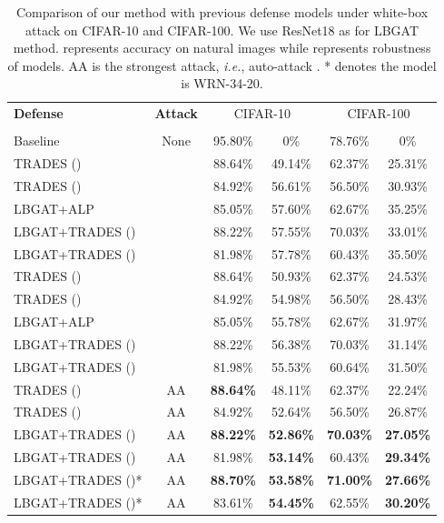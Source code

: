 \documentclass[10pt,twocolumn,letterpaper]{article}
\begin{document}
\begin{table*}[t!]
	\centering
	\caption{Comparison of our method with previous defense models under white-box attack on CIFAR-10 and CIFAR-100. We use ResNet18 as  for LBGAT method.  represents accuracy on natural images while  represents robustness of models. AA is the strongest attack, {\it i.e.}, auto-attack \cite{croce2020reliable}. * denotes the model is WRN-34-20.
	}
    {
	\begin{tabular}{l|c|c | c | c |c }
		\hline
		\hline
		\multirow{2}{*}{\textbf{Defense}} & \multirow{2}{*}{\textbf{Attack}} & \multicolumn{2}{c|}{CIFAR-10} & \multicolumn{2}{c}{CIFAR-100} \\
		\cline{3-6}
		& & & & & \\
		\hline
		Baseline                      & None  &95.80\% &0\% &78.76\% &0\% \\       
		\hline
		TRADES ()           & &88.64\% & 49.14\% &62.37\% &25.31\% \\
		TRADES ()           & &84.92\% & 56.61\% &56.50\% &30.93\% \\
		LBGAT+ALP                     & &85.05\% &57.60\% &62.67\% &35.25\% \\
		LBGAT+TRADES ()     & &88.22\% &57.55\% &70.03\% &33.01\%  \\
		LBGAT+TRADES ()     & &81.98\% &57.78\% &60.43\% &35.50\%  \\
		\hline
		TRADES ()  &  &88.64\%  &50.93\% &62.37\% &24.53\% \\
		TRADES ()  &  &84.92\%  &54.98\% &56.50\% &28.43\% \\
		LBGAT+ALP                    &    &85.05\% &55.78\% &62.67\% &31.97\% \\
		LBGAT+TRADES ()    &    &88.22\% &56.38\% &70.03\% &31.14\% \\
		LBGAT+TRADES ()    &    &81.98\% &55.53\% &60.64\% &31.50\% \\
		\hline
		TRADES ()                       &AA &\textbf{88.64\%} &48.11\% &62.37\% &22.24\% \\
		TRADES ()                       &AA &84.92\% &52.64\% &56.50\% &26.87\% \\
		LBGAT+TRADES ()                 &AA &\textbf{88.22\%} &\textbf{52.86\%} &\textbf{70.03\%} &\textbf{27.05\%} \\
		LBGAT+TRADES ()                 &AA &81.98\% &\textbf{53.14\%} &60.43\% &\textbf{29.34\%} \\
		\hline
		LBGAT+TRADES ()*                &AA &\textbf{88.70\%} &\textbf{53.58\%} &\textbf{71.00\%} &\textbf{27.66\%} \\
		LBGAT+TRADES ()*                &AA &83.61\% &\textbf{54.45\%} &62.55\% &\textbf{30.20\%} \\
		\hline
	\end{tabular}
	\label{tab:white-box}
    }
\vspace{-0.05in}
\end{table*}
\end{document}
